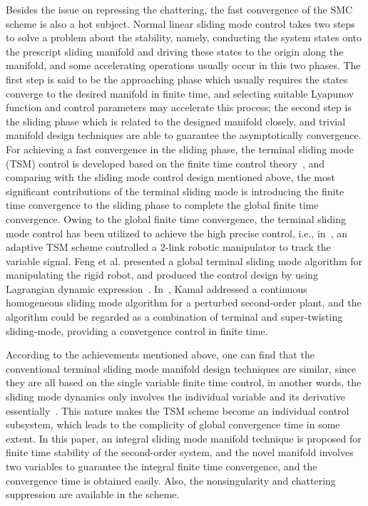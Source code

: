 \documentclass[3p]{elsarticle}
\theoremstyle{plain}
\theoremstyle{remark}
\begin{document}
Besides the issue on repressing the chattering, the fast convergence of the SMC scheme is also a hot subject. Normal linear sliding mode control takes two steps to solve a problem about the stability, namely, conducting the system states onto the prescript sliding manifold and driving these states to the origin along the manifold, and some accelerating operations usually occur in this two phases. The first step is said to be the approaching phase which usually requires the states converge to the desired manifold in finite time, and selecting suitable Lyapunov function and control parameters may accelerate this process; the second step is the sliding phase which is related to the designed manifold closely, and trivial manifold design techniques are able to guarantee the asymptotically convergence. For achieving a fast convergence in the sliding phase, the terminal sliding mode (TSM) control is developed based on the finite time control theory~\cite{haimo1986finite,bhat1997finite}, and comparing with the sliding mode control design mentioned above, the most significant contributions of the terminal sliding mode is introducing the finite time convergence to the sliding phase to complete the global finite time convergence. Owing to the global finite time convergence, the terminal sliding mode control has been utilized to achieve the high precise control, i.e., in~\cite{li2015robust}, an adaptive TSM scheme controlled a $2$-link robotic manipulator to track the variable signal. Feng et al. presented a global terminal sliding mode algorithm for manipulating the rigid robot, and produced the control design by using Lagrangian dynamic expression~\cite{feng2002non}. In~\cite{kamal2016continuous}, Kamal addressed a continuous homogeneous sliding mode algorithm for a perturbed second-order plant, and the algorithm could be regarded as a combination of terminal and super-twisting sliding-mode, providing a convergence control in finite time. \par
According to the achievements mentioned above, one can find that the conventional terminal sliding mode manifold design techniques are similar, since they are all based on the single variable finite time control, in another words, the sliding mode dynamics only involves the individual variable and its derivative essentially~\cite{mu2016switching}. This nature makes the TSM scheme become an individual control subsystem, which leads to the complicity of global convergence time in some extent. In this paper, an integral sliding mode manifold technique is proposed for finite time stability of the second-order system, and the novel manifold involves two variables to guarantee the integral finite time convergence, and the convergence time is obtained easily. Also, the nonsingularity and chattering suppression are available in the scheme. \par
\end{document}
